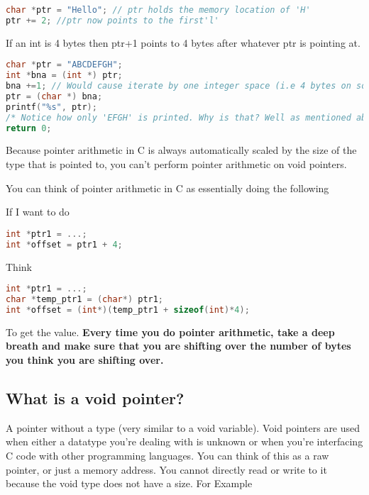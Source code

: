 \begin{lstlisting}[language=C]
char *ptr = "Hello"; // ptr holds the memory location of 'H'
ptr += 2; //ptr now points to the first'l'
\end{lstlisting}

If an int is 4 bytes then ptr+1 points to 4 bytes after whatever ptr is
pointing at.

\begin{lstlisting}[language=C]
char *ptr = "ABCDEFGH";
int *bna = (int *) ptr;
bna +=1; // Would cause iterate by one integer space (i.e 4 bytes on some systems)
ptr = (char *) bna;
printf("%s", ptr);
/* Notice how only 'EFGH' is printed. Why is that? Well as mentioned above, when performing 'bna+=1' we are increasing the **integer** pointer by 1, (translates to 4 bytes on most systems) which is equivalent to 4 characters (each character is only 1 byte)*/
return 0;
\end{lstlisting}

Because pointer arithmetic in C is always automatically scaled by the
size of the type that is pointed to, you can't perform pointer
arithmetic on void pointers.

You can think of pointer arithmetic in C as essentially doing the
following

If I want to do

\begin{lstlisting}[language=C]
int *ptr1 = ...;
int *offset = ptr1 + 4;
\end{lstlisting}

Think

\begin{lstlisting}[language=C]
int *ptr1 = ...;
char *temp_ptr1 = (char*) ptr1;
int *offset = (int*)(temp_ptr1 + sizeof(int)*4);
\end{lstlisting}

To get the value. \textbf{Every time you do pointer arithmetic, take a
	deep breath and make sure that you are shifting over the number of bytes
	you think you are shifting over.}

\subsection{What is a void pointer?}

A pointer without a type (very similar to a void variable). Void pointers are used when either a datatype you're dealing with is unknown or when you're interfacing C code with other programming languages. You can think of this as a raw pointer, or just a memory address. You cannot directly read or write to it because the void type does not have a size. For Example

